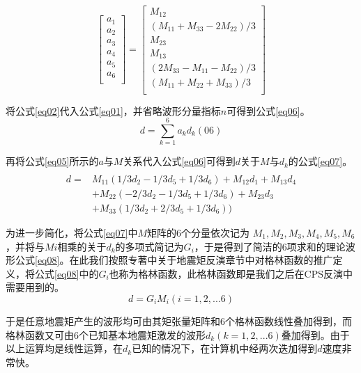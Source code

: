 \begin{equation}
\label{eq05}
\left[\begin{array}{c}
a_1\\
a_2\\
a_3\\
a_4\\
a_5\\
a_6\\
\end{array}\right]=
\left[\begin{array}{c}
M_{12}\\
(M_{11}+M_{33}-2M_{22})/3\\
M_{23}\\
M_{13}\\
(2M_{33}-M_{11}-M_{22})/3\\
(M_{11}+M_{22}+M_{33})/3\\
\end{array}\right]
\end{equation}

将公式\ref{eq02}代入公式\ref{eq01}，并省略波形分量指标$n$可得到公式\ref{eq06}。
\begin{equation}
\label{eq06}
d=\sum_{k=1}^{6}a_kd_k(06)
\end{equation}

再将公式\ref{eq05}所示的$a$与$M$关系代入公式\ref{eq06}可得到$d$关于$M$与$d_k$的公式\ref{eq07}。
\begin{equation}
\label{eq07}
\begin{array}{rl}\\
d=&M_{11}(1/3d_2-1/3d_5+1/3d_6)+M_{12}d_1+M_{13}d_4\\
&+M_{22}(-2/3d_2-1/3d_5+1/3d_6)+M_{23}d_3\\
&+M_{33}(1/3d_2+2/3d_5+1/3d_6))
\end{array}
\end{equation}

为进一步简化，将公式\ref{eq07}中$M$矩阵的6个分量依次记为 $M_1,M_2,M_3,M_4,M_5,M_6$，并将与$Mi$相乘的关于$d_k$的多项式简记为$G_i$，于是得到了简洁的6项求和的理论波形公式\ref{eq08}。在此我们按照\citet{Stein2003}专著中关于地震矩反演章节中对格林函数的推广定义，将公式\ref{eq08}中的$G_i$也称为格林函数，此格林函数即是我们之后在CPS反演中需要用到的。
\begin{equation}
\label{eq08}
d=G_iM_i(i=1,2,...6)
\end{equation}

于是任意地震矩产生的波形均可由其矩张量矩阵和6个格林函数线性叠加得到，而格林函数又可由6个已知基本地震矩激发的波形$d_k(k=1,2,...6)$叠加得到。由于以上运算均是线性运算，在$d_k$已知的情况下，在计算机中经两次迭加得到$d$速度非常快。

